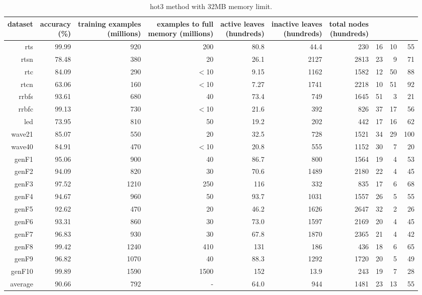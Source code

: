 \clearpage
\begin{table}
\caption{{\sc hot3} method with 32MB memory limit.}
\label{tab:hot3-32MB}
\centering
\begin{tabular}{|r|r|r|r|r|r|r|r|r|r|}
\hline
dataset	&
\rotatebox{90}{\parbox{9em}{accuracy\\(\%)}} &
\rotatebox{90}{\parbox{9em}{training examples\\(millions)}} &
\rotatebox{90}{\parbox{9em}{examples to full\\memory (millions)}} &
\rotatebox{90}{\parbox{9em}{active leaves\\(hundreds)}} &
\rotatebox{90}{\parbox{9em}{inactive leaves\\(hundreds)}} &
\rotatebox{90}{\parbox{9em}{total nodes\\(hundreds)}} &
\rotatebox{90}{\parbox{9em}{tree depth}}	&
\rotatebox{90}{\parbox{9em}{training speed (\%)}} &
\rotatebox{90}{\parbox{9em}{prediction speed (\%)}} \\
\hline
{\sc rts} & 99.99 & 920 & 200 & 80.8 & 44.4 & 230 & 16 & 10 & 55 \\
{\sc rtsn} & 78.48 & 380 & 20 & 26.1 & 2127 & 2813 & 23 & 9 & 71 \\
{\sc rtc} & 84.09 & 290 & $<$10 & 9.15 & 1162 & 1582 & 12 & 50 & 88 \\
{\sc rtcn} & 63.06 & 160 & $<$10 & 7.27 & 1741 & 2218 & 10 & 51 & 92 \\
{\sc rrbfs} & 93.61 & 680 & 40 & 73.4 & 749 & 1645 & 51 & 3 & 21 \\
{\sc rrbfc} & 99.13 & 730 & $<$10 & 21.6 & 392 & 826 & 37 & 17 & 56 \\
{\sc led} & 73.95 & 810 & 50 & 19.2 & 202 & 442 & 17 & 16 & 62 \\
{\sc wave21} & 85.07 & 550 & 20 & 32.5 & 728 & 1521 & 34 & 29 & 100 \\
{\sc wave40} & 84.91 & 470 & $<$10 & 20.8 & 555 & 1152 & 30 & 7 & 20 \\
{\sc genF1} & 95.06 & 900 & 40 & 86.7 & 800 & 1564 & 19 & 4 & 53 \\
{\sc genF2} & 94.09 & 820 & 30 & 70.6 & 1489 & 2180 & 22 & 4 & 45 \\
{\sc genF3} & 97.52 & 1210 & 250 & 116 & 332 & 835 & 17 & 6 & 68 \\
{\sc genF4} & 94.67 & 960 & 50 & 93.7 & 1031 & 1557 & 26 & 5 & 55 \\
{\sc genF5} & 92.62 & 470 & 20 & 46.2 & 1626 & 2647 & 32 & 2 & 26 \\
{\sc genF6} & 93.31 & 860 & 30 & 73.0 & 1597 & 2169 & 20 & 4 & 45 \\
{\sc genF7} & 96.83 & 930 & 30 & 67.8 & 1870 & 2365 & 21 & 4 & 42 \\
{\sc genF8} & 99.42 & 1240 & 410 & 131 & 186 & 436 & 18 & 6 & 65 \\
{\sc genF9} & 96.82 & 1070 & 40 & 88.3 & 1292 & 1720 & 20 & 5 & 49 \\
{\sc genF10} & 99.89 & 1590 & 1500 & 152 & 13.9 & 243 & 19 & 7 & 28 \\
\hline
average & 90.66 & 792 &  -  & 64.0 & 944 & 1481 & 23 & 13 & 55 \\
\hline
\end{tabular}
\end{table}
